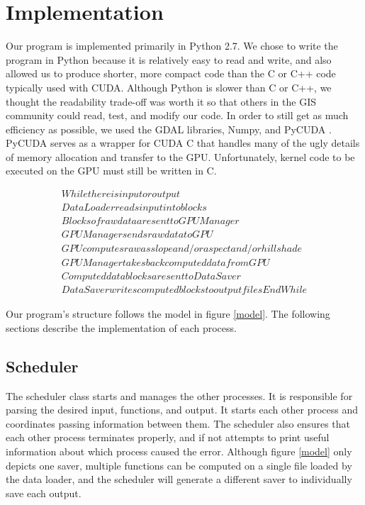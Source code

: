 \documentclass[journal]{IEEEtran}
\begin{document}
\section{Implementation} \label{implementation}
    Our program is implemented primarily in Python 2.7. We chose to write the
    program in Python because it is relatively easy to read and write, and also
    allowed us to produce shorter, more compact code than the C or C++ code
    typically used with CUDA.  Although Python is slower than C or C++, we
    thought the readability trade-off was worth it so that others in the GIS
    community could read, test, and modify our code. In order to still get as
    much efficiency as possible, we used the GDAL libraries, Numpy, and PyCUDA
    \cite{pycuda_1} \cite{pycuda_2}. PyCUDA serves as a wrapper for CUDA C that
    handles many of the ugly details of memory allocation and transfer to the
    GPU. Unfortunately, kernel code to be executed on the GPU must still be
    written in C. 
    
    \begin{align*}
        While there is input or output
	\\DataLoader reads input into blocks
	\\Blocks of raw data are sent to GPUManager
	\\GPUManager sends raw data to GPU
	\\GPU computes raw as slope and/or aspect and/or hillshade
	\\GPUManager takes back computed data from GPU
	\\Computed data blocks are sent to DataSaver
	\\DataSaver writes computed blocks to output files
	End While
    \end{align*}
    
    Our program's structure follows the model in figure \ref{model}. The
    following sections describe the implementation of each process.

    \subsection{Scheduler}
    The scheduler class starts and manages the other processes. It is
    responsible for parsing the desired input, functions, and output. It starts
    each other process and coordinates passing information between them. The
    scheduler also ensures that each other process terminates properly, and if
    not attempts to print useful information about which process caused the
    error. Although figure \ref{model} only depicts one saver, multiple
    functions can be computed on a single file loaded by the data loader, and
    the scheduler will generate a different saver to individually save each
    output.
    
\end{document}
